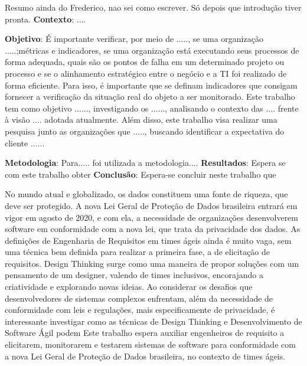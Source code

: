 Resumo ainda do Frederico, nao sei como escrever. Só depois que introdução tiver pronta.
\textbf{Contexto}: ....

\textbf{Objetivo}: É importante verificar, por meio de ....., se  uma organização .....;métricas e indicadores, se uma organização está executando seus processos de forma adequada, quais são os pontos de falha em um determinado projeto ou processo e se o alinhamento estratégico entre o negócio e a TI foi realizado de forma eficiente. Para isso, é importante que se definam indicadores que consigam fornecer a verificação da situação real do objeto a ser monitorado. Este trabalho tem como objetivo ......, investigando os ......, analisando o contexto das .... frente à visão .... adotada atualmente. Além disso, este trabalho visa realizar uma pesquisa junto as organizações que ....., buscando identificar a expectativa do cliente ...... 

\textbf{Metodologia}: Para..... foi utilizada a metodologia.... \textbf{Resultados}: Espera se com este trabalho obter  \textbf{Conclusão}: Espera-se concluir neste trabalho que 

No mundo atual e globalizado, os dados constituem uma fonte de riqueza, que deve ser protegido. A nova Lei Geral de Proteção de Dados brasileira entrará em vigor em agosto de 2020, e com ela, a necessidade de organizações desenvolverem software em conformidade com a nova lei, que trata da privacidade dos dados. As definições de Engenharia de Requisitos em times ágeis ainda é muito vaga, sem uma técnica bem definida para realizar a primeira fase, a de elicitação de requisitos. Design Thinking surge como uma maneira de propor soluções com um pensamento de um designer, valendo de times inclusivos, encorajando a criatividade e explorando novas ideias. Ao considerar os desafios que desenvolvedores de sistemas complexos enfrentam, além da necessidade de conformidade com leis e regulações, mais especificamente de privacidade, é interessante investigar como as técnicas de Design Thinking e Desenvolvimento de Software Ágil podem
Este trabalho espera auxiliar engenheiros de requisito a elicitarem, monitorarem e testarem sistemas de software para conformidade com a nova Lei Geral de Proteção de Dados brasileira, no contexto de times ágeis.
